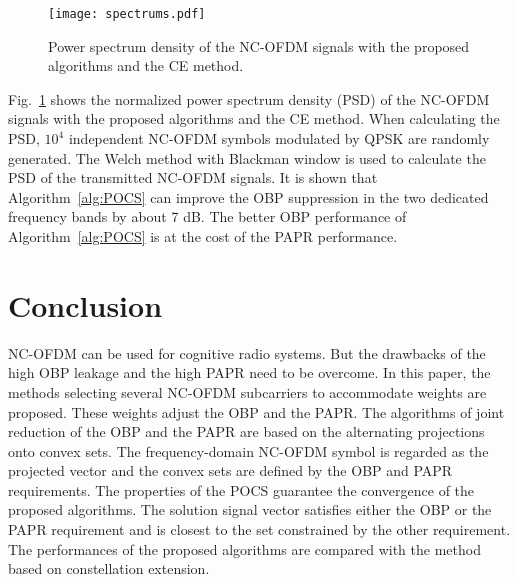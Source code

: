 \documentclass[paper]{ieice}
\begin{document}
\begin{figure}[t]
	\centering
	\texttt{[image: spectrums.pdf]}
	\caption{Power spectrum density of the NC-OFDM signals with the proposed algorithms and the CE method.}
	\label{fig:spectrums}
\end{figure}
Fig.~\ref{fig:spectrums} shows the normalized power spectrum density (PSD) of the NC-OFDM
signals with the proposed algorithms and the CE method. When calculating the PSD,  $10^4$ independent NC-OFDM symbols modulated by QPSK are randomly generated. The Welch method with Blackman window is used to calculate the PSD of the transmitted NC-OFDM signals.  It is shown that Algorithm~\ref{alg:POCS} can improve the OBP suppression in the two dedicated frequency bands by about 7 dB. The better OBP performance of Algorithm~\ref{alg:POCS} is at the cost of the PAPR performance.

\section{Conclusion}
\label{sec:conclusion}
NC-OFDM can be used for cognitive radio systems. But the drawbacks of the high OBP leakage and the high PAPR need to be overcome. In this paper, the methods selecting several NC-OFDM subcarriers to accommodate weights are proposed.  These weights adjust the OBP and the PAPR. The algorithms of joint reduction of the OBP and the PAPR are based on the alternating projections onto convex sets. The frequency-domain NC-OFDM symbol is regarded as the projected vector and the convex sets are defined by the OBP and PAPR requirements.  The properties of the POCS guarantee the convergence of the proposed algorithms. The solution signal vector satisfies either the OBP or the PAPR requirement and is closest to the set constrained by the other requirement. The performances of the proposed algorithms are compared with the method based on constellation extension.

%
%
\end{document}
